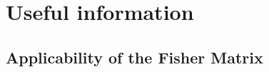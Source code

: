 \chapter{Useful information}
\label{sec:app}

\section{Applicability of the Fisher Matrix}
\label{sec:app_fisher_valid}


